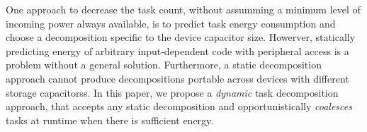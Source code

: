 One approach to decrease the task count, without assumming a minimum level of
incoming power always available, is to predict task energy consumption and
choose a decomposition specific to the device capacitor size.
%
Howerver, statically predicting energy of arbitrary input-dependent code with
peripheral access is a problem without a general solution.
%
Furthermore, a static decomposition approach cannot produce decompositions
portable across devices with different storage capacitorss.
%
In this paper, we propose a \emph{dynamic} task decomposition approach, that
accepts any static decomposition and opportunistically \emph{coalesces} tasks
at runtime when there is sufficient energy.


